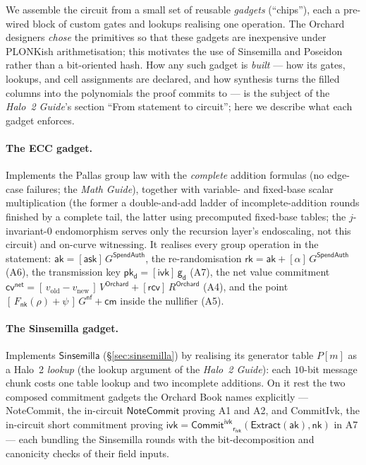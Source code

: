 \documentclass[11pt,a4paper]{article}
\theoremstyle{definition}
\newcommand{\cmsym}{\mathsf{cm}}
\newcommand{\cvsym}{\mathsf{cv}}
\newcommand{\rk}{\mathsf{rk}}
\newcommand{\NoteCommit}{\ensuremath{\mathsf{NoteCommit}}}
\newcommand{\Sinsemilla}{\ensuremath{\mathsf{Sinsemilla}}}
\newcommand{\CommitIvk}{\ensuremath{\mathsf{Commit}^{\mathsf{ivk}}}}
\newcommand{\Extract}{\ensuremath{\mathsf{Extract}}}
\newcommand{\ask}{\ensuremath{\mathsf{ask}}}
\newcommand{\aksym}{\ensuremath{\mathsf{ak}}}
\newcommand{\nksym}{\ensuremath{\mathsf{nk}}}
\newcommand{\ivk}{\ensuremath{\mathsf{ivk}}}
\newcommand{\pkd}{\ensuremath{\mathsf{pk_d}}}
\newcommand{\gd}{\ensuremath{\mathsf{g_d}}}
\newcommand{\rcv}{\ensuremath{\mathsf{rcv}}}
\newcommand{\rivk}{\ensuremath{\mathsf{r_{ivk}}}}
\begin{document}
We assemble the circuit from a small set of reusable \emph{gadgets} (``chips''),
each a pre-wired block of custom gates and lookups realising one operation. The
Orchard designers \emph{chose} the primitives so that these gadgets are inexpensive under
PLONKish arithmetisation; this motivates the use of Sinsemilla and Poseidon
rather than a bit-oriented hash. How any such gadget is \emph{built} --- how
its gates, lookups, and cell assignments are declared, and how synthesis
turns the filled columns into the polynomials the proof commits to --- is
the subject of the \emph{Halo~2 Guide}'s section ``From statement to
circuit''; here we describe what each gadget enforces.

\paragraph{The ECC gadget.} Implements the Pallas group law with the
\emph{complete} addition formulas (no edge-case failures; the
\emph{Math Guide}), together with variable- and fixed-base scalar
multiplication (the former a double-and-add ladder of incomplete-addition
rounds finished by a complete tail, the latter using precomputed fixed-base
tables; the $j$-invariant-$0$ endomorphism serves only the recursion layer's
endoscaling, not this circuit) and
on-curve witnessing. It realises every group operation in the statement:
$\aksym = [\ask]\,G^{\mathsf{SpendAuth}}$, the re-randomisation
$\rk = \aksym + [\alpha]\,G^{\mathsf{SpendAuth}}$ (A6), the transmission key
$\pkd = [\ivk]\,\gd$ (A7), the net value commitment
$\cvsym^{\mathsf{net}} = [\,v_{\mathrm{old}}-v_{\mathrm{new}}\,]\,V^{\mathsf{Orchard}} + [\rcv]\,R^{\mathsf{Orchard}}$
(A4), and the point $[\,F_{\nksym}(\rho)+\psi\,]\,G^{\mathsf{nf}} + \cmsym$ inside
the nullifier (A5).

\paragraph{The Sinsemilla gadget.} Implements $\Sinsemilla$
(\S\ref{sec:sinsemilla}) by realising its generator table $P[m]$ as a Halo~2
\emph{lookup} (the lookup argument of the \emph{Halo~2 Guide}): each $10$-bit
message chunk costs one table lookup and two incomplete additions. On it rest
the two composed commitment gadgets the Orchard Book names explicitly ---
\textsf{NoteCommit}, the in-circuit $\NoteCommit$ proving A1 and A2, and
\textsf{CommitIvk}, the in-circuit short commitment proving
$\ivk = \CommitIvk_{\rivk}(\Extract(\aksym),\nksym)$ in A7 --- each bundling the
Sinsemilla rounds with the bit-decomposition and canonicity checks of their field
inputs.
\end{document}
